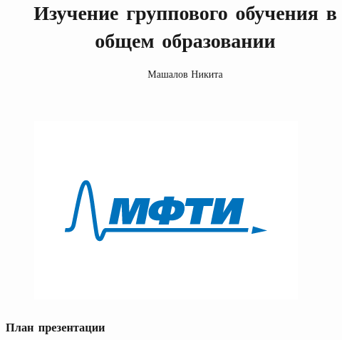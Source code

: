 \documentclass[
	11pt
]{beamer}
\title[Анализ в сфере образования]{Изучение группового обучения в общем образовании}
\author[Машалов Никита]{Машалов Никита}
\begin{document}

\begin{frame}
    \begin{figure}
        \includegraphics[width=0.2\linewidth]{assets/MIPT.png}
    \end{figure}
    \titlepage %
\end{frame}

\begin{frame}
    \frametitle{План презентации} %
    \tableofcontents
\end{frame}





% 


\end{document}
